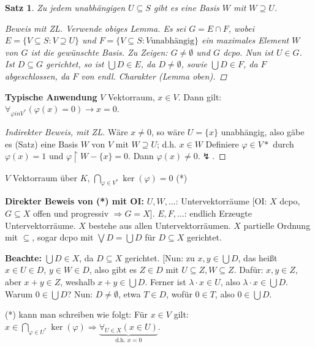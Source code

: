 \documentclass[headsepline=true,DIV=11]{scrartcl}
\newtheorem*{theorem}{Satz}
\theoremstyle{definition}
\newenvironment{gelaber}{}{}
\begin{document}

\begin{theorem}
	Zu jedem unabhängigen $U\subseteq S$ gibt es eine Basis $W$ mit $W\supseteq U$.
	\begin{proof}[Beweis mit ZL]
		Verwende obiges Lemma.
		Es sei $G=E\cap F$, wobei $E=\{V\subseteq S\colon V\supseteq U\}$ und 
		$F = \{V\subseteq S\colon V \text{unabhängig}\}$ ein maximales Element $W$ von $G$ ist die gewünschte Basis.
		Zu Zeigen: $G\neq \emptyset$ und $G$ dcpo.
		Nun ist $U\in G$.
		Ist $D\subseteq G$ gerichtet, so ist $\bigcup D\in E$, da $D\neq \emptyset$, sowie $\bigcup D\in F$, da $F$ abgeschlossen, da $F$ von endl. Charakter (Lemma oben).
	\end{proof}
\end{theorem}

\begin{gelaber}
	{\bf Typische Anwendung} $V$ Vektorraum, $x\in V$. 
	Dann gilt: $\forall_{\varphi in V^*} ( \varphi(x)=0)\to x=0$.
	\begin{proof}[Indirekter Beweis, mit ZL]
		Wäre $x\neq 0$, so wäre $U=\{x\}$ unabhängig, also gäbe es (Satz) eine Basis $W$ von $V$ mit $W\supseteq U$; d.h. $x\in W$ 
		Definiere $\varphi \in V*$ durch $\varphi(x)=1$ und $\varphi\upharpoonright W-\{x\}=0$.
		Dann $\varphi(x)\neq 0$.$\lightning$.
	\end{proof}
\end{gelaber}


$V$ Vektorraum über $K$, $\bigcap\limits_{\varphi\in V^*} \ker(\varphi)=0$ (*)

{\bf Direkter Beweis von (*) mit OI:} $U, W, \ldots$: Untervektorräume [OI: $X$ dcpo, $G\subseteq X$ offen und progressiv $\Rightarrow G=X$]. $E, F,
\ldots$: endlich Erzeugte Untervektorräume. $X$ bestehe aus allen Untervektorräumen. $X$ partielle Ordnung mit $\subseteq$, sogar dcpo mit $\bigvee
D=\bigcup D$ für $D\subseteq X$ gerichtet.

{\bf Beachte:} $\bigcup D\in X$, da $D\subseteq X$ gerichtet. [Nun: zu $x,y\in \bigcup D$, das heißt $x\in U\in D$, $y\in W\in D$, also gibt es $Z\in
  D$ mit $U\subseteq Z, W\subseteq Z$. Dafür: $x, y\in Z$, aber $x+y\in Z$, weshalb $x+y\in\bigcup D$. Ferner ist $\lambda\cdot x\in U$, also
  $\lambda\cdot x\in\bigcup D$. Warum $0\in\bigcup D$? Nun: $D\neq\emptyset$, etwa $T\in D$, wofür $0\in T$, also $0\in\bigcup D$.

(*) kann man schreiben wie folgt: Für $x\in V$ gilt: $x\in\bigcap\limits_{\varphi\in U^*}\ker(\varphi) \Rightarrow \underbrace{\forall_{U\in X}(x\in
    U)}_{\mbox{d.h. }x=0}$.
\end{document}
